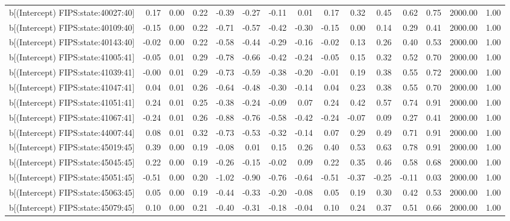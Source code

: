 \begin{table}[ht]
\begin{tabular}{rrrrrrrrrrrrrrr}
  b[(Intercept) FIPS:state:40027:40] & 0.17 & 0.00 & 0.22 & -0.39 & -0.27 & -0.11 & 0.01 & 0.17 & 0.32 & 0.45 & 0.62 & 0.75 & 2000.00 & 1.00 \\ 
  b[(Intercept) FIPS:state:40109:40] & -0.15 & 0.00 & 0.22 & -0.71 & -0.57 & -0.42 & -0.30 & -0.15 & 0.00 & 0.14 & 0.29 & 0.41 & 2000.00 & 1.00 \\ 
  b[(Intercept) FIPS:state:40143:40] & -0.02 & 0.00 & 0.22 & -0.58 & -0.44 & -0.29 & -0.16 & -0.02 & 0.13 & 0.26 & 0.40 & 0.53 & 2000.00 & 1.00 \\ 
  b[(Intercept) FIPS:state:41005:41] & -0.05 & 0.01 & 0.29 & -0.78 & -0.66 & -0.42 & -0.24 & -0.05 & 0.15 & 0.32 & 0.52 & 0.70 & 2000.00 & 1.00 \\ 
  b[(Intercept) FIPS:state:41039:41] & -0.00 & 0.01 & 0.29 & -0.73 & -0.59 & -0.38 & -0.20 & -0.01 & 0.19 & 0.38 & 0.55 & 0.72 & 2000.00 & 1.00 \\ 
  b[(Intercept) FIPS:state:41047:41] & 0.04 & 0.01 & 0.26 & -0.64 & -0.48 & -0.30 & -0.14 & 0.04 & 0.23 & 0.38 & 0.55 & 0.70 & 2000.00 & 1.00 \\ 
  b[(Intercept) FIPS:state:41051:41] & 0.24 & 0.01 & 0.25 & -0.38 & -0.24 & -0.09 & 0.07 & 0.24 & 0.42 & 0.57 & 0.74 & 0.91 & 2000.00 & 1.00 \\ 
  b[(Intercept) FIPS:state:41067:41] & -0.24 & 0.01 & 0.26 & -0.88 & -0.76 & -0.58 & -0.42 & -0.24 & -0.07 & 0.09 & 0.27 & 0.41 & 2000.00 & 1.00 \\ 
  b[(Intercept) FIPS:state:44007:44] & 0.08 & 0.01 & 0.32 & -0.73 & -0.53 & -0.32 & -0.14 & 0.07 & 0.29 & 0.49 & 0.71 & 0.91 & 2000.00 & 1.00 \\ 
  b[(Intercept) FIPS:state:45019:45] & 0.39 & 0.00 & 0.19 & -0.08 & 0.01 & 0.15 & 0.26 & 0.40 & 0.53 & 0.63 & 0.78 & 0.91 & 2000.00 & 1.00 \\ 
  b[(Intercept) FIPS:state:45045:45] & 0.22 & 0.00 & 0.19 & -0.26 & -0.15 & -0.02 & 0.09 & 0.22 & 0.35 & 0.46 & 0.58 & 0.68 & 2000.00 & 1.00 \\ 
  b[(Intercept) FIPS:state:45051:45] & -0.51 & 0.00 & 0.20 & -1.02 & -0.90 & -0.76 & -0.64 & -0.51 & -0.37 & -0.25 & -0.11 & 0.03 & 2000.00 & 1.00 \\ 
  b[(Intercept) FIPS:state:45063:45] & 0.05 & 0.00 & 0.19 & -0.44 & -0.33 & -0.20 & -0.08 & 0.05 & 0.19 & 0.30 & 0.42 & 0.53 & 2000.00 & 1.00 \\ 
  b[(Intercept) FIPS:state:45079:45] & 0.10 & 0.00 & 0.21 & -0.40 & -0.31 & -0.18 & -0.04 & 0.10 & 0.24 & 0.37 & 0.51 & 0.66 & 2000.00 & 1.00 \\ 

\end{tabular}
\end{table}
